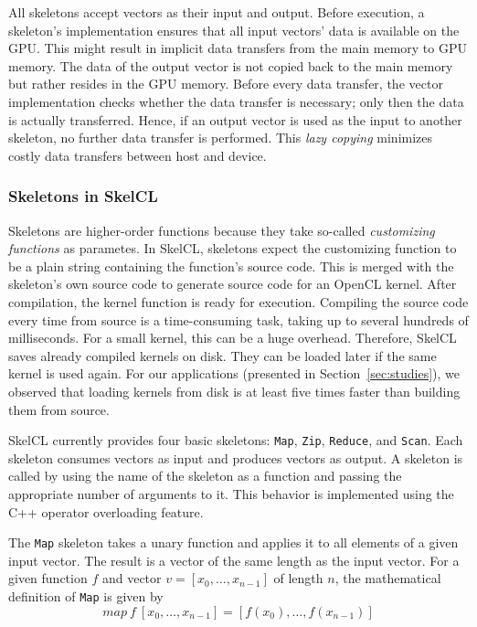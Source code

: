 All skeletons accept vectors as their input and output.
Before execution, a skeleton's implementation ensures that all input vectors' data is available on the GPU.
This might result in implicit data transfers from the main memory to GPU memory.
The data of the output vector is not copied back to the main memory but rather resides in the GPU memory.
Before every data transfer, the vector implementation checks whether the data transfer is necessary;
only then the data is actually transferred.
Hence, if an output vector is used as the input to another skeleton, no further data transfer is performed.
This \emph{lazy copying} minimizes costly data transfers between host and device.


\subsubsection{Skeletons in SkelCL}

Skeletons are higher-order functions because they take so-called \emph{customizing functions} as parametes.
In SkelCL, skeletons expect the customizing function to be a plain string containing the function's source code.
This is merged with the skeleton's own source code to generate source code for an OpenCL kernel.
After compilation, the kernel function is ready for execution.
Compiling the source code every time from source is a time-consuming task, taking up to several hundreds of milliseconds.
For a small kernel, this can be a huge overhead.
Therefore, SkelCL saves already compiled kernels on disk.
They can be loaded later if the same kernel is used again.
For our applications (presented in Section~\ref{sec:studies}), we observed that loading kernels from disk is at least five times faster than building them from source.

SkelCL currently provides four basic skeletons: \texttt{Map}, \texttt{Zip}, \texttt{Reduce}, and \texttt{Scan}.
Each skeleton consumes vectors as input and produces vectors as output.
A skeleton is called by using the name of the skeleton as a function and passing the appropriate number of arguments to it.
This behavior is implemented using the C++ operator overloading feature.

The \texttt{Map} skeleton takes a unary function and applies it to all elements of a given input vector.
The result is a vector of the same length as the input vector.
For a given function $f$ and vector $v = [x_0, \ldots, x_{n-1}]$ of length $n$, the mathematical definition of \texttt{Map} is given by
\begin{equation}
map\:f\:[x_0, \ldots, x_{n-1}] = [f(x_0), \ldots, f(x_{n-1})]
\end{equation}

